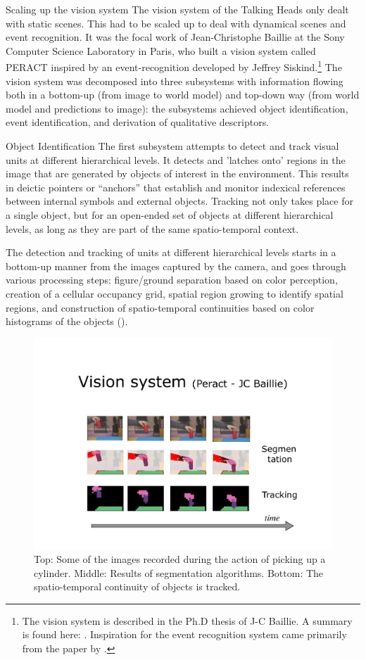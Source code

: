 {\bfshape  Scaling up the vision system} 
The vision system of the Talking Heads only dealt with static scenes. This had to be scaled up to
deal with dynamical scenes and event recognition. It was the focal work of 
Jean-Christophe Baillie at the Sony Computer Science Laboratory in Paris, who built a vision system 
called PERACT  inspired by an event-recognition developed by Jeffrey 
Siskind.\footnote{The vision system is described in the Ph.D thesis of J-C Baillie. A summary is found here: 
\cite{Steels:2003}. Inspiration for the event recognition system came 
primarily from the paper by \cite{Siskind:2000}.}
The vision system was decomposed into three subsystems with information flowing both in a bottom-up
(from image to world model) and top-down way (from world model and predictions to image): the subsystems achieved 
object identification, event identification, and derivation of qualitative descriptors. 

{\bfshape  Object Identification} The first subsystem attempts to detect and track visual units at different hierarchical levels. 
It detects and 'latches onto' regions in the image that are generated by objects of 
interest in the environment. This results in deictic pointers or ``anchors'' that establish and monitor indexical references 
between internal symbols and external objects. Tracking not only takes place for a single object, but for 
an open-ended set of objects at different hierarchical levels, as long as they are part of the same spatio-temporal context. 

The detection and tracking of units at different hierarchical levels starts in a bottom-up manner from the images captured by the camera, and goes through various processing steps: figure/ground separation based on color perception, creation of a cellular occupancy grid, spatial region growing to identify spatial regions, and construction of spatio-temporal continuities based on 
color histograms of the objects (). 

\begin{figure}[htbp]
  \centerline{\includegraphics[width=.80\textwidth]{chap10/figs/peract-images.pdf}}
\caption{\label{fig:peract-images} 
Top: Some of the images recorded during the action of picking up a cylinder. 
Middle: Results of segmentation algorithms. 
Bottom: The spatio-temporal continuity of objects is tracked. 
}
\end{figure}


